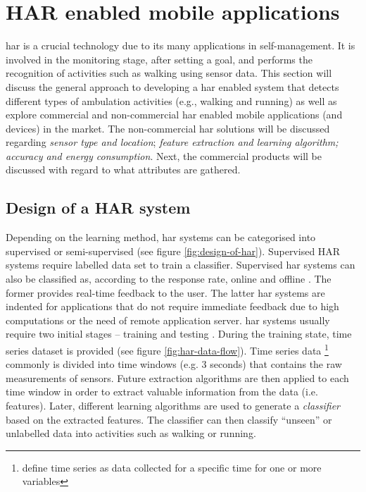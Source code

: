 \section{HAR enabled mobile applications}
\gls{har} is a crucial technology due to its many applications in self-management. It is involved in the monitoring stage, after setting a goal, and performs the recognition of activities such as walking using sensor data. This section will discuss the general approach to developing a \gls{har} enabled system that detects different types of ambulation activities (e.g., walking and running) as well as explore commercial and non-commercial \gls{har} enabled mobile applications (and devices) in the market. The non-commercial \gls{har} solutions will be discussed regarding \textit{sensor type and location}; \textit{feature extraction and learning algorithm; accuracy and energy consumption}. Next, the commercial products will be discussed with regard to what attributes are gathered.

    \subsection{Design of a HAR system}
    \label{section:design_of_har_system}
    Depending on the learning method, \gls{har} systems can be categorised into supervised or semi-supervised (see figure \ref{fig:design-of-har}). Supervised HAR systems require labelled data set to train a classifier. Supervised \gls{har} systems can also be classified as, according to the response rate, online and offline \citep[29]{labrador2013}. The former provides real-time feedback to the user. The latter \gls{har} systems are indented for applications that do not require immediate feedback due to high computations or the need of remote application server. \gls{har} systems usually require two initial stages – training and testing \citep[4]{labrador2013}. During the training state, time series dataset is provided (see figure \ref{fig:har-data-flow}). Time series data \footnote{ \citet{torresreyna2012} define time series as data collected for a specific time for one or more variables}  commonly is divided into time windows (e.g. 3 seconds) that contains the raw measurements of sensors. Future extraction algorithms are then applied to each time window in order to extract valuable information from the data (i.e. features). Later, different learning algorithms are used to generate a \textit{classifier} based on the extracted features. The classifier can then classify “unseen” or unlabelled data into activities such as walking or running. 
    

